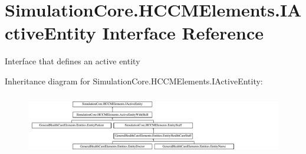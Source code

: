 \hypertarget{interface_simulation_core_1_1_h_c_c_m_elements_1_1_i_active_entity}{}\section{Simulation\+Core.\+H\+C\+C\+M\+Elements.\+I\+Active\+Entity Interface Reference}
\label{interface_simulation_core_1_1_h_c_c_m_elements_1_1_i_active_entity}


Interface that defines an active entity  


Inheritance diagram for Simulation\+Core.\+H\+C\+C\+M\+Elements.\+I\+Active\+Entity\+:\begin{figure}[H]
\begin{center}
\leavevmode
\includegraphics[height=2.681992cm]{interface_simulation_core_1_1_h_c_c_m_elements_1_1_i_active_entity}
\end{center}
\end{figure}
